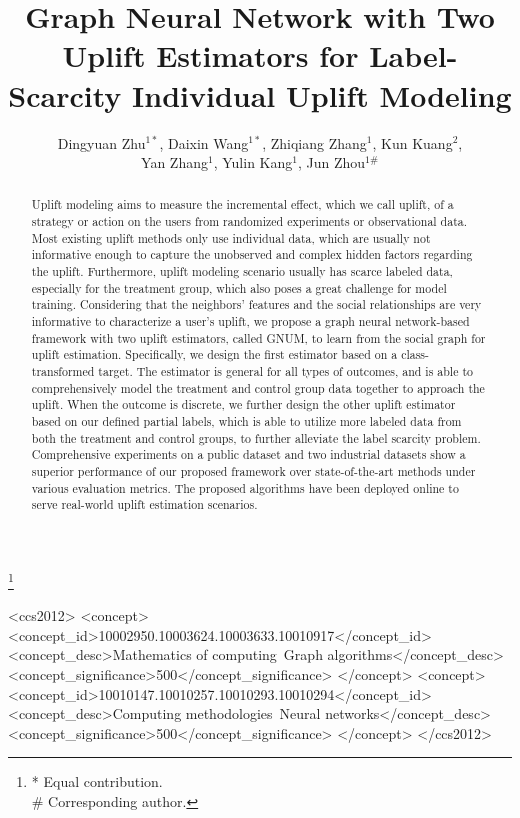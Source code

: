 \documentclass[sigconf]{acmart}
\begin{document}
\title{Graph Neural Network with Two Uplift Estimators for Label-Scarcity Individual Uplift Modeling}

\author{Dingyuan Zhu$^{1*}$, Daixin Wang$^{1*}$, Zhiqiang Zhang$^1$, Kun Kuang$^{2}$, \\
Yan Zhang$^1$, Yulin Kang$^1$, Jun Zhou$^{1\#}$}
\thanks{* Equal contribution. \\
\# Corresponding author.}

\begin{abstract}
Uplift modeling aims to measure the incremental effect, which we call uplift, of a strategy or action on the users from randomized experiments or observational data. Most existing uplift methods only use individual data, which are usually not informative enough to capture the unobserved and complex hidden factors regarding the uplift. Furthermore, uplift modeling scenario usually has scarce labeled data, especially for the treatment group, which also poses a great challenge for model training. Considering that the neighbors' features and the social relationships are very informative to characterize a user's uplift, we propose a graph neural network-based framework with two uplift estimators, called GNUM, to learn from the social graph for uplift estimation. Specifically, we design the first estimator based on a class-transformed target. The estimator is general for all types of outcomes, and is able to comprehensively model the treatment and control group data together to approach the uplift. When the outcome is discrete, we further design the other uplift estimator based on our defined partial labels, which is able to utilize more labeled data from both the treatment and control groups, to further alleviate the label scarcity problem. Comprehensive experiments on a public dataset and two industrial datasets show a superior performance of our proposed framework over state-of-the-art methods under various evaluation metrics. The proposed algorithms have been deployed online to serve real-world uplift estimation scenarios. 
\end{abstract}

\begin{CCSXML}
<ccs2012>
<concept>
<concept_id>10002950.10003624.10003633.10010917</concept_id>
<concept_desc>Mathematics of computing~Graph algorithms</concept_desc>
<concept_significance>500</concept_significance>
</concept>
<concept>
<concept_id>10010147.10010257.10010293.10010294</concept_id>
<concept_desc>Computing methodologies~Neural networks</concept_desc>
<concept_significance>500</concept_significance>
</concept>
</ccs2012>
\end{CCSXML}

\maketitle  












\clearpage

\appendix

\end{document}

